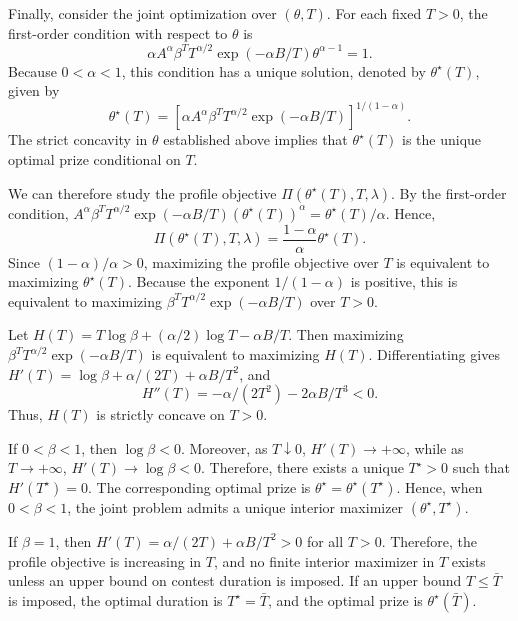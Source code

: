 \documentclass[mnsc]{informs3}
\begin{document}
\begin{APPENDICES}
Finally, consider the joint optimization over $(\theta,T)$. For each fixed $T>0$, the first-order condition with respect to $\theta$ is
\begin{equation*}
\alpha A^\alpha \beta^T T^{\alpha/2}\exp(-\alpha B/T)\theta^{\alpha-1}=1.
\end{equation*}
Because $0<\alpha<1$, this condition has a unique solution, denoted by $\theta^\star(T)$, given by
\begin{equation*}
\theta^\star(T)
=
\left[
\alpha A^\alpha \beta^T T^{\alpha/2}\exp(-\alpha B/T)
\right]^{1/(1-\alpha)}.
\end{equation*}
The strict concavity in $\theta$ established above implies that $\theta^\star(T)$ is the unique optimal prize conditional on $T$.

We can therefore study the profile objective $\Pi(\theta^\star(T),T,\lambda)$. By the first-order condition, $A^\alpha \beta^T T^{\alpha/2}\exp(-\alpha B/T)(\theta^\star(T))^\alpha=\theta^\star(T)/\alpha$. Hence,
\begin{equation*}
\Pi(\theta^\star(T),T,\lambda)
=
\frac{1-\alpha}{\alpha}\theta^\star(T).
\end{equation*}
Since $(1-\alpha)/\alpha>0$, maximizing the profile objective over $T$ is equivalent to maximizing $\theta^\star(T)$. Because the exponent $1/(1-\alpha)$ is positive, this is equivalent to maximizing $\beta^T T^{\alpha/2}\exp(-\alpha B/T)$ over $T>0$.

Let $H(T)=T\log\beta+(\alpha/2)\log T-\alpha B/T$. Then maximizing $\beta^T T^{\alpha/2}\exp(-\alpha B/T)$ is equivalent to maximizing $H(T)$. Differentiating gives $H'(T)=\log\beta+\alpha/(2T)+\alpha B/T^2$, and
\begin{equation*}
H''(T)
=
-\alpha/(2T^2)-2\alpha B/T^3
<
0.
\end{equation*}
Thus, $H(T)$ is strictly concave on $T>0$.

If $0<\beta<1$, then $\log\beta<0$. Moreover, as $T\downarrow 0$, $H'(T)\to+\infty$, while as $T\to+\infty$, $H'(T)\to\log\beta<0$. Therefore, there exists a unique $T^\star>0$ such that $H'(T^\star)=0$. The corresponding optimal prize is $\theta^\star=\theta^\star(T^\star)$. Hence, when $0<\beta<1$, the joint problem admits a unique interior maximizer $(\theta^\star,T^\star)$.

If $\beta=1$, then $H'(T)=\alpha/(2T)+\alpha B/T^2>0$ for all $T>0$. Therefore, the profile objective is increasing in $T$, and no finite interior maximizer in $T$ exists unless an upper bound on contest duration is imposed. If an upper bound $T\leq \bar T$ is imposed, the optimal duration is $T^\star=\bar T$, and the optimal prize is $\theta^\star(\bar T)$.
\Halmos
\endproof





\end{APPENDICES}
\end{document}
